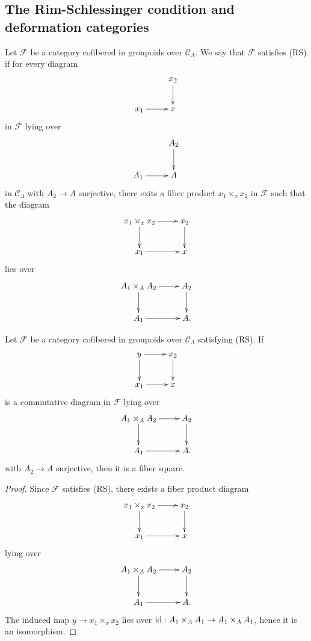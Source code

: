 \subsection{The Rim-Schlessinger condition and deformation categories}
\label{subsection-RS-condition}

\begin{definition}
\label{definition-RS}
Let $\mathcal F$ be a category cofibered in groupoids over $\mathcal 
C_{\Lambda}$.  We say that $\mathcal F$ satisfies (RS) if for every diagram
\[
\xymatrix{
           & x_2 \ar[d] \\
x_1 \ar[r] & x   
}
\]
in $\mathcal F$ lying over
\[
\xymatrix{
           & A_2 \ar[d] \\
A_1 \ar[r] & A   
}
\]  
in $\mathcal C_{\Lambda}$ with $A_2 \rightarrow A$ surjective, there exits a 
fiber product $x_1 \times_{x} x_2$ in $\mathcal F$ such that the diagram
\[
\xymatrix{
x_1 \times_{x} x_2 \ar[r] \ar[d] & x_2 \ar[d] \\
x_1 \ar[r]      & x   
}
\]
lies over
\[
\xymatrix{
A_1 \times_{A} A_2 \ar[r] \ar[d] & A_2 \ar[d] \\
A_1 \ar[r]      & A.   
}
\]
\end{definition}

\begin{lemma}
\label{lemma-RS-fiber-square}
Let $\mathcal F$ be a category cofibered in groupoids over $\mathcal 
C_{\Lambda}$ satisfying \textnormal{(RS)}.  If
\[
\xymatrix{
y \ar[r] \ar[d] & x_2 \ar[d]   \\
x_1 \ar[r]      & x  
}
\]
is a commutative diagram in $\mathcal F$ lying over
\[
\xymatrix{
A_1 \times_{A} A_2 \ar[r] \ar[d] & A_2 \ar[d] \\
A_1 \ar[r]      & A.   
}
\]
with $A_2 \rightarrow A$ surjective, then it is a fiber square.
\end{lemma}

\begin{proof}
Since $\mathcal F$ satisfies (RS), there exists a fiber product diagram
\[
\xymatrix{
x_1 \times_{x} x_2 \ar[r] \ar[d] & x_2 \ar[d] \\
x_1 \ar[r]      & x   
}
\]
lying over 
\[
\xymatrix{
A_1 \times_{A} A_2 \ar[r] \ar[d] & A_2 \ar[d] \\
A_1 \ar[r]      & A.   
}
\]
The induced map $y \rightarrow x_1 \times_{x} x_2$ lies over $\textnormal{id}: 
A_1 \times_{A} A_1 \rightarrow A_1 \times_{A} A_1$, hence it is an isomorphism.
\end{proof}

